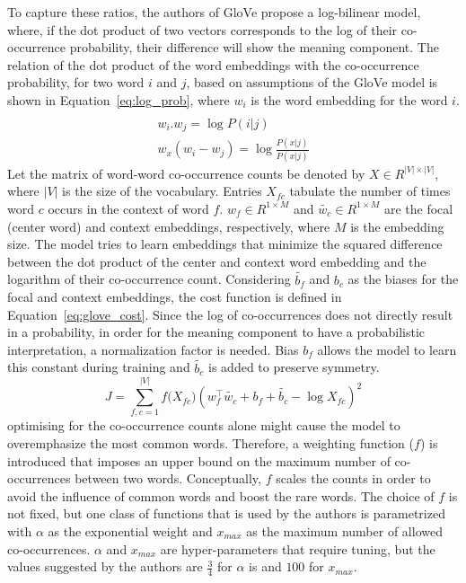 \noindent
To capture these ratios, the authors of GloVe propose a log-bilinear model, where, if the dot product of two vectors corresponds to the log of their co-occurrence probability, their difference will show the meaning component. The relation of the dot product of the word embeddings with the co-occurrence probability, for two word $i$ and $j$, based on assumptions of the GloVe model is shown in Equation~\ref{eq:log_prob}, where $w_i$ is the word embedding for the word $i$. 
\begin{equation}
\begin{split}
\\ w_{ i }.w_{ j }=\log { P(i|j)\quad  } \\
w_{ x }(w_{ i }-w_{ j })=\log { \frac { P(x|j) }{ P(x|j) } } 
\end{split}
\label{eq:log_prob}
\end{equation}
Let the matrix of word-word co-occurrence counts be denoted by $X\in { R }^{ |V|\times |V| }$, where $|V|$ is the size of the vocabulary.  Entries $X_{fc}$ tabulate the number of times word $c$ occurs in the context of word $f$. $w_{ f }\in { R }^{ 1\times M }$ and $\tilde{w_{ c }}\in { R }^{ 1\times M }$ are the focal (center word) and context embeddings, respectively, where $M$ is the embedding size. The model tries to learn embeddings that minimize the squared difference between the dot product of the center and context word embedding and the logarithm of their co-occurrence count.
Considering $ \tilde{b_{ f }}$ and $b_{ c }$  as the biases for the focal and context embeddings, the cost function is defined in Equation~\ref{eq:glove_cost}. Since the log of co-occurrences does not directly result in a probability, in order for the meaning component to have a probabilistic interpretation, a normalization factor is needed. Bias $b_{ f }$ allows the model to learn this constant during training and $ \tilde{b_{ c }}$ is added to preserve symmetry. 
\begin{equation}
J=\sum _{ f,c=1 }^{ |V| }{ f({ X }_{ fc } } )(w_{ f }^{ \top }\tilde{  w_{ c } } +b_{ f }+\tilde{  b_{ c } } -\log{ X }_{ fc })^2
\label{eq:glove_cost}
\end{equation}
optimising for the co-occurrence counts alone might cause the model to overemphasize the most common words. Therefore, a weighting function ($f$) is introduced that imposes an upper bound on the maximum number of co-occurrences between two words. Conceptually, $f$ scales the counts in order to avoid the influence of common words and boost the rare words. The choice of $f$ is not fixed, but one class of functions that is used by the authors is parametrized with $\alpha$ as the exponential weight and $x_{max}$ as the maximum number of allowed co-occurrences. $\alpha$ and $x_{max}$ are hyper-parameters that require tuning, but the values suggested by the authors are $\frac{3}{4}$ for $\alpha$ is  and $100$ for $x_{max}$. 

